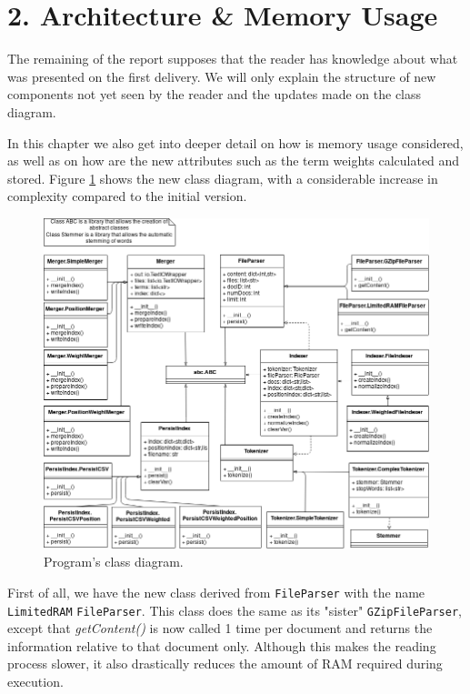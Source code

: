 \documentclass[12pt]{article}
\begin{document}
\section*{2. Architecture \& Memory Usage}

The remaining of the report supposes that the reader has knowledge about what
was presented on the first delivery. 
We will only explain the structure of new components not yet seen by the reader 
and the updates made on the class diagram.

In this chapter we also get into deeper detail on how is memory usage
considered, as well as on how are the new attributes such as the term weights 
calculated and stored.
Figure \ref{fig:classdiagram} shows the new class diagram, with a considerable
increase in complexity compared to the initial version.

\begin{figure}[h!]
\includegraphics[width=\linewidth]{ClassDiagram_assign2.png}
\caption{Program's class diagram.}
\label{fig:classdiagram}
\end{figure}

First of all, we have the new class derived from \texttt{FileParser} with the
name \texttt{LimitedRAM} \texttt{FileParser}. This class does the same as its 
"sister" \texttt{GZipFileParser}, except that \textit{getContent()} is now 
called 1 time per document and returns the information relative to that 
document only. 
Although this makes the reading process slower, it also drastically 
reduces the amount of RAM required during execution.
\end{document}
